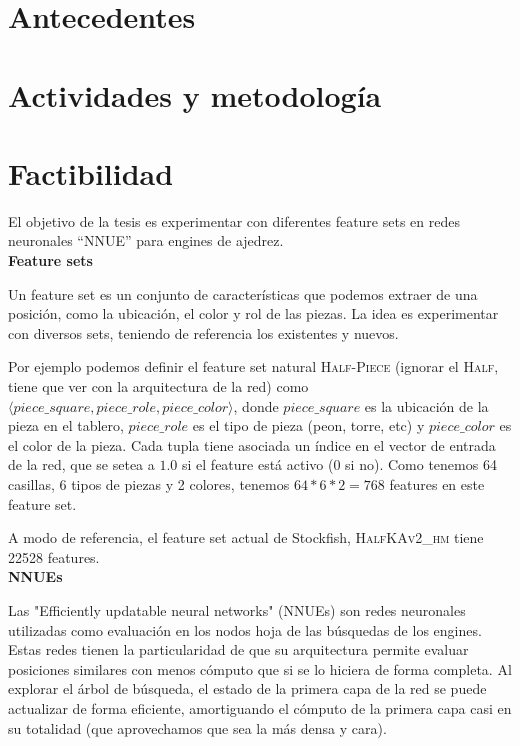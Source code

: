 \documentclass[12pt]{article}
\begin{document}




\blindtext[1]

\section*{Antecedentes}

\blindtext[1]

\section*{Actividades y metodología}

\blindtext[1]

\section*{Factibilidad}


El objetivo de la tesis es experimentar con diferentes feature sets en redes neuronales ``NNUE'' para engines de ajedrez. \\

\textbf{Feature sets}

Un feature set es un conjunto de características que podemos extraer de una posición, como la ubicación, el color y rol de las piezas. La idea es experimentar con diversos sets, teniendo de referencia los existentes y nuevos.

Por ejemplo podemos definir el feature set natural \textsc{Half-Piece} (ignorar el \textsc{Half}, tiene que ver con la arquitectura de la red) como $\langle piece\_square, piece\_role, piece\_color \rangle$, donde $piece\_square$ es la ubicación de la pieza en el tablero, $piece\_role$ es el tipo de pieza (peon, torre, etc) y $piece\_color$ es el color de la pieza. Cada tupla tiene asociada un índice en el vector de entrada de la red, que se setea a $1.0$ si el feature está activo (0 si no). Como tenemos 64 casillas, 6 tipos de piezas y 2 colores, tenemos $64*6*2=768$ features en este feature set.

A modo de referencia, el feature set actual de Stockfish, \textsc{HalfKAv2\_hm} tiene 22528 features. \\

\textbf{NNUEs}

Las "Efficiently updatable neural networks" (NNUEs) son redes neuronales utilizadas como evaluación en los nodos hoja de las búsquedas de los engines. Estas redes tienen la particularidad de que su arquitectura permite evaluar posiciones similares con menos cómputo que si se lo hiciera de forma completa. Al explorar el árbol de búsqueda, el estado de la primera capa de la red se puede actualizar de forma eficiente, amortiguando el cómputo de la primera capa casi en su totalidad (que aprovechamos que sea la más densa y cara).
\end{document}
